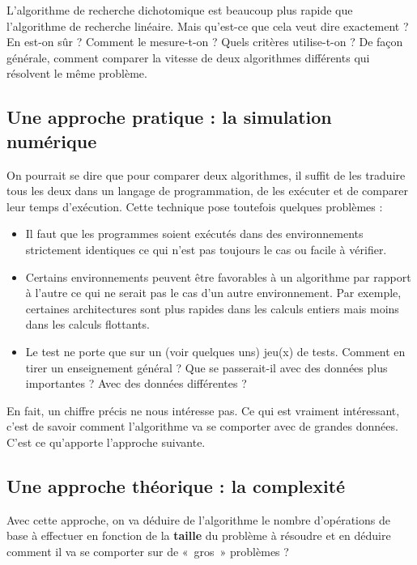 		L’algorithme de recherche dichotomique 
		est beaucoup plus rapide que l’algorithme de recherche linéaire. 
		Mais qu’est-ce que cela veut dire exactement ? 
		En est-on sûr ? 
		Comment le mesure-t-on ? 
		Quels critères utilise-t-on ?
		De façon générale, comment comparer la vitesse
		de deux algorithmes différents qui résolvent le même problème.
		
		\subsection{Une approche pratique : la simulation numérique}
	
			On pourrait se dire que pour comparer deux algorithmes, 
			il suffit de les traduire tous les deux 
			dans un langage de programmation, 
			de les exécuter et de comparer leur temps d’exécution. 
			Cette technique pose toutefois quelques problèmes :			
			\begin{itemize}
				\item 
					Il faut que les programmes soient exécutés 
					dans des environnements strictement identiques 
					ce qui n’est pas toujours le cas ou facile à vérifier.
				\item
					Certains environnements peuvent être favorables
					à un algorithme par rapport à l'autre
					ce qui ne serait pas le cas d'un autre environnement.
					Par exemple, certaines architectures
					sont plus rapides dans les calculs entiers
					mais moins dans les calculs flottants.
				\item 
					Le test ne porte que sur un (voir quelques uns) jeu(x) de tests. 
					Comment en tirer un enseignement général ? 
					Que se passerait-il avec des données plus importantes ? 
					Avec des données différentes ?
			\end{itemize}		
			En fait, un chiffre précis ne nous intéresse pas. 
			Ce qui est vraiment intéressant,
			c'est de savoir comment l'algorithme va se comporter
			avec de grandes données.
			C'est ce qu'apporte l'approche suivante.
		
		\subsection{Une approche théorique : la complexité}
		
			Avec cette approche,
			on va déduire de l'algorithme
			le nombre d’opérations de base à effectuer
			en fonction de la \textbf{taille} du problème à résoudre
			et en déduire 
			comment il va se comporter sur de «~gros~» problèmes ?
		
